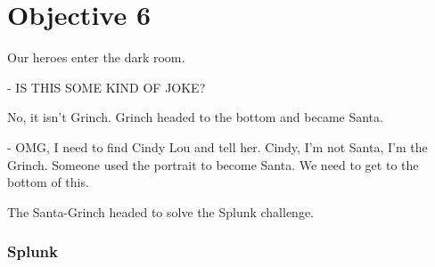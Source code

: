 \chapter{Objective 6}

Our heroes enter the dark room.

- IS THIS SOME KIND OF JOKE?

No, it isn't Grinch. Grinch headed to the bottom and became Santa.

- OMG, I need to find Cindy Lou and tell her. Cindy, I'm not Santa, I'm the Grinch. Someone used the portrait to become Santa. We need to get to the bottom of this.

The Santa-Grinch headed to solve the Splunk challenge.

\subsection{Splunk}
